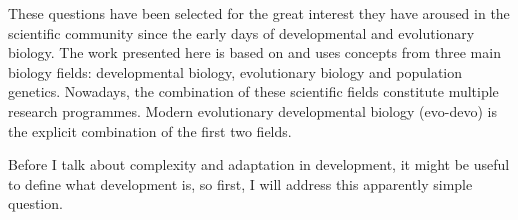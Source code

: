 These questions have been selected for the great interest they have aroused in the scientific community since the early days of developmental and evolutionary biology.
%
The work presented here is based on and uses concepts from three main biology fields: 
developmental biology, evolutionary biology and population genetics.
Nowadays, the combination of these scientific fields constitute multiple research programmes. Modern evolutionary developmental biology (evo-devo) is the explicit combination of the first two fields.

%

Before I talk about complexity and adaptation in development, it might be useful to define what development is, so first, I will address this apparently simple question.